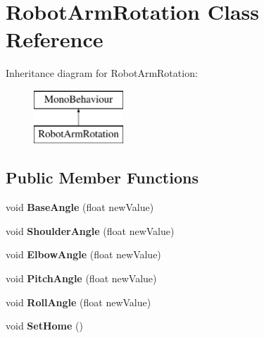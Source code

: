 \hypertarget{class_robot_arm_rotation}{}\section{Robot\+Arm\+Rotation Class Reference}
\label{class_robot_arm_rotation}
Inheritance diagram for Robot\+Arm\+Rotation\+:\begin{figure}[H]
\begin{center}
\leavevmode
\includegraphics[height=2.000000cm]{class_robot_arm_rotation}
\end{center}
\end{figure}
\subsection*{Public Member Functions}
\begin{DoxyCompactItemize}
\item 
\mbox{\label{class_robot_arm_rotation_a689c2fd152644d287fe7221e389b2139}} 
void {\bfseries Base\+Angle} (float new\+Value)
\item 
\mbox{\label{class_robot_arm_rotation_a0ceefe20e7fe5cda73e8ce3cee4cb26d}} 
void {\bfseries Shoulder\+Angle} (float new\+Value)
\item 
\mbox{\label{class_robot_arm_rotation_ac730983653129e9aa547c0f64f7a4237}} 
void {\bfseries Elbow\+Angle} (float new\+Value)
\item 
\mbox{\label{class_robot_arm_rotation_abfa68f97741241c45b89c02d49b8f0da}} 
void {\bfseries Pitch\+Angle} (float new\+Value)
\item 
\mbox{\label{class_robot_arm_rotation_aac489e7eb6d5ceba400781ef2268f3a4}} 
void {\bfseries Roll\+Angle} (float new\+Value)
\item 
\mbox{\label{class_robot_arm_rotation_a3080cbbc78ef97b736d3829c5cb82573}} 
void {\bfseries Set\+Home} ()
\end{DoxyCompactItemize}
